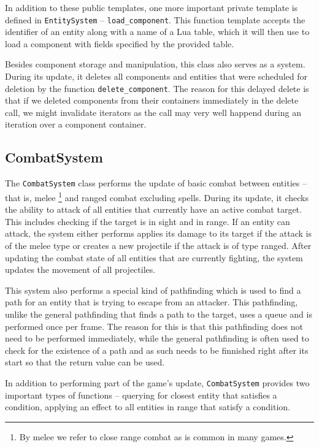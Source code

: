 In addition to these public templates, one more important private template is defined in \texttt{EntitySystem} -- \texttt{load\_component}.
This function template accepts the identifier of an entity along with a name of a Lua table, which it will then use to load a component
with fields specified by the provided table.

Besides component storage and manipulation, this class also serves as a system. During its update, it deletes all components and entities
that were scheduled for deletion by the function \texttt{delete\_component}. The reason for this delayed delete is that if we deleted
components from their containers immediately in the delete call, we might invalidate iterators as the call may very well happend during
an iteration over a component container.

\subsection{CombatSystem}

The \texttt{CombatSystem} class performs the update of basic combat between entities -- that is, melee
\footnote{By melee we refer to close range combat as is common in many games.} and ranged combat excluding spells.
During its update, it checks the ability to attack of all entities that currently have an active combat target. This includes checking
if the target is in sight and in range. If an entity can attack, the system either performs applies its damage to its target if the
attack is of the melee type or creates a new projectile if the attack is of type ranged.
After updating the combat state of all entities that are currently fighting, the system updates the movement of all projectiles.

This system also performs a special kind of pathfinding which is used to find a path for an entity that is trying to escape from an attacker.
This pathfinding, unlike the general pathfinding that finds a path to the target, uses a queue and is performed once per frame. The reason for
this is that this pathfinding does not need to be performed immediately, while the general pathfinding is often used to check for the
existence of a path and as such needs to be finnished right after its start so that the return value can be used.

In addition to performing part of the game's update, \texttt{CombatSystem} provides two important types of functions -- querying for closest
entity that satisfies a condition, applying an effect to all entities in range that satisfy a condition.

